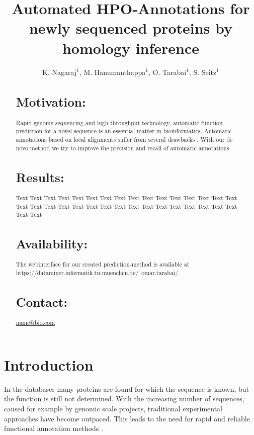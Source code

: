 \documentclass{bioinfo}
\begin{document}

\title[HPO Annotator]{Automated HPO-Annotations for newly sequenced proteins by homology inference}
\author{K. Nagaraj$^{1}$, M. Hanumanthappa$^{1}$, O. Tarabai$^{1}$, S. Seitz$^{1}$}
\address{$^{1}$Fakul\"at f\"ur Informatik, Boltzmannstr. 3, 85748 Garching}



\maketitle

\begin{abstract}

\section{Motivation:}
Rapid genome sequencing and high-throughput technology, automatic function prediction for a novel sequence is an essential matter in bioinformatics. Automatic annotations based on local alignments suffer from several drawbacks \citep{Ori06}. With our de novo method we try to improve the precision and recall of automatic annotations.
\section{Results:}
Text  Text Text Text Text Text Text Text Text Text  Text Text Text Text Text Text Text Text Text  Text Text Text Text Text Text Text Text Text  Text Text Text Text Text Text

\section{Availability:}
The webinterface for our created prediction-method is available at https://dataminer.informatik.tu-muenchen.de/~omar.tarabai/.

\section{Contact:} \href{name@bio.com}{name@bio.com}
\end{abstract}

\section{Introduction}
In the databases many proteins are found for which the sequence is known, but the function is still not determined. With the increasing number of sequences, caused for example by genomic scale projects, traditional experimental approaches have become outpaced. This leads to the need for rapid and reliable functional annotation methods \citep{Rodrigues07}. 
\end{document}
